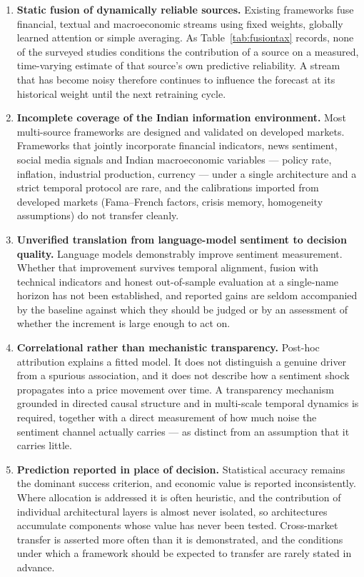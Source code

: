 \begin{enumerate}[label=\textbf{G\arabic*.},leftmargin=2.8em]
\item \textbf{Static fusion of dynamically reliable sources.} Existing frameworks fuse
financial, textual and macroeconomic streams using fixed weights, globally learned attention or
simple averaging. As Table~\ref{tab:fusiontax} records, none of the surveyed studies conditions
the contribution of a source on a measured, time-varying estimate of that source's own
predictive reliability. A stream that has become noisy therefore continues to influence the
forecast at its historical weight until the next retraining cycle.

\item \textbf{Incomplete coverage of the Indian information environment.} Most multi-source
frameworks are designed and validated on developed markets. Frameworks that jointly incorporate
financial indicators, news sentiment, social media signals and Indian macroeconomic variables
--- policy rate, inflation, industrial production, currency --- under a single architecture and
a strict temporal protocol are rare, and the calibrations imported from developed markets
(Fama--French factors, crisis memory, homogeneity assumptions) do not transfer cleanly.

\item \textbf{Unverified translation from language-model sentiment to decision quality.}
Language models demonstrably improve sentiment measurement. Whether that improvement survives
temporal alignment, fusion with technical indicators and honest out-of-sample evaluation at a
single-name horizon has not been established, and reported gains are seldom accompanied by the
baseline against which they should be judged or by an assessment of whether the increment is
large enough to act on.

\item \textbf{Correlational rather than mechanistic transparency.} Post-hoc attribution explains
a fitted model. It does not distinguish a genuine driver from a spurious association, and it
does not describe how a sentiment shock propagates into a price movement over time. A
transparency mechanism grounded in directed causal structure and in multi-scale temporal
dynamics is required, together with a direct measurement of how much noise the sentiment channel
actually carries --- as distinct from an assumption that it carries little.

\item \textbf{Prediction reported in place of decision.} Statistical accuracy remains the
dominant success criterion, and economic value is reported inconsistently. Where allocation is
addressed it is often heuristic, and the contribution of individual architectural layers is
almost never isolated, so architectures accumulate components whose value has never been tested.
Cross-market transfer is asserted more often than it is demonstrated, and the conditions under
which a framework should be expected to transfer are rarely stated in advance.
\end{enumerate}

